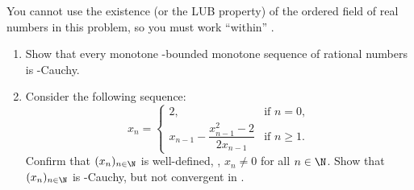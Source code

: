\documentclass[12pt]{article}
\begin{document}
\begin{problem*}
    You cannot use the existence (or the LUB property) of the ordered field
    of real numbers in this problem, so you must work ``within'' \Q.
    \begin{enumerate}[label=(\arabic*)]
        \item Show that every monotone \Q-bounded monotone sequence
        of rational numbers is \Q-Cauchy.
        \item Consider the following sequence: \[
            x_n = \begin{cases}
                2, & \text{if } n = 0, \\
                x_{n-1} - \dfrac{x_{n-1}^2 - 2}{2 x_{n-1}}
                    & \text{if } n \ge 1.
            \end{cases}
        \] Confirm that $(x_n)_{n \in \N}$ is well-defined, \ie,
        $x_n \ne 0$ for all $n \in \N$.
        Show that $(x_n)_{n \in \N}$ is \Q-Cauchy, but not convergent in \Q.
    \end{enumerate}
\end{problem*}
\end{document}
